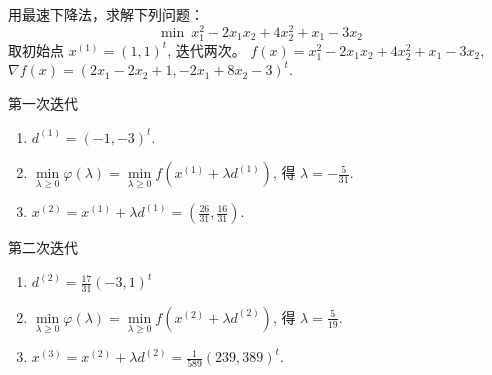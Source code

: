 \begin{Problem}
    用最速下降法，求解下列问题：
    \[\min \ x_1^2 - 2x_1x_2 + 4x_2^2 + x_1 - 3x_2\]
    取初始点 $x^{(1)} = (1, 1)^t$, 迭代两次。
    \Answer $f(x) = x_1^2 - 2x_1x_2 + 4x_2^2 + x_1 - 3x_2$, $\nabla f(x) = (2x_1 - 2x_2 + 1, -2x_1 + 8x_2 - 3)^t$. 
    
    第一次迭代 
    \begin{enumerate}
        \item $d^{(1)} = (-1, -3)^t$.
        \item $\underset{\lambda \ge 0}{\min} \varphi(\lambda) = \underset{\lambda \ge 0}{\min}f(x^{(1)} + \lambda d^{(1)})$, 得 $\lambda = -\frac{5}{31}$.
        \item $x^{(2)} = x^{(1)} + \lambda d^{(1)} = (\frac{26}{31}, \frac{16}{31})$.
    \end{enumerate}

    第二次迭代
    \begin{enumerate}
        \item $d^{(2)} = \frac{17}{31}(-3, 1)^t$
        \item $\underset{\lambda \ge 0}{\min} \varphi(\lambda) = \underset{\lambda \ge 0}{\min}f(x^{(2)} + \lambda d^{(2)})$, 得 $\lambda = \frac{5}{19}$.
        \item $x^{(3)} = x^{(2)} + \lambda d^{(2)} = \frac{1}{589}(239, 389)^t$. 
    \end{enumerate}
\end{Problem}

